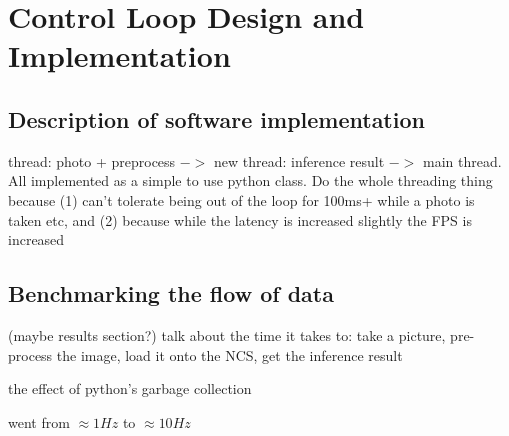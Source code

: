 \chapter{Control Loop Design and Implementation}


\section{Description of software implementation}
{\Large \color{red} thread: photo + preprocess $->$ new thread: inference result $->$ main thread. All implemented as a simple to use python class. Do the whole threading thing because (1) can't tolerate being out of the loop for 100ms+ while a photo is taken etc, and (2) because while the latency is increased slightly the FPS is increased}



\section{Benchmarking the flow of data}
{\Large \color{red} (maybe results section?) talk about the time it takes to: take a picture, pre-process the image, load it onto the NCS, get the inference result}

{\Large \color{red} the effect of python's garbage collection}

{\Large \color{red} went from $\approx 1 Hz$ to $\approx 10 Hz$ }

